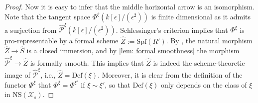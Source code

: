 \documentclass[letter, 11pt]{article}
\theoremstyle{plain}
\theoremstyle{definition}
\newcommand{\Spec}{\mathrm{Spec}}
\newcommand{\<}{\langle}
\renewcommand{\>}{\rangle}
\newcommand{\sX}{\mathcal{X}}
\newcommand{\Spf}{\mathrm{Spf}}
\newcommand{\shP}{\mathscr{P}}
\newcommand{\Def}{\mathrm{Def}}
\newcommand{\cris}{\mathrm{cris}}
\newcommand{\NS}{\mathrm{NS}}
\begin{document}
\begin{proof}

     
     Now it is easy to infer that the middle horizontal arrow is an isomorphism. Note that the tangent space $\Phi^\xi(k[\epsilon]/(\epsilon^2))$ is finite dimensional as it admits a surjection from $\hat{\shP}^\xi(k[\epsilon]/(\epsilon^2))$. Schlessinger's criterion \cite[Thm~2.11]{Schlessinger} implies that $\Phi^\xi$ is pro-representable by a formal scheme $\hat{Z} := \Spf(R')$. By \cite[Lem.~2.1.7]{HO_conjecture}, the natural morphism $\hat{Z} \to \hat{S}$ is a closed immersion, and by \ref{lem: formal smoothness} the morphism $\hat{\shP}^\xi \to \hat{Z}$ is formally smooth. This implies that $\hat{Z}$ is indeed the scheme-theoretic image of $\hat{\shP}^\xi$, i.e., $\hat{Z} = \Def(\xi)$. Moreover, it is clear from the definition of the functor $\Phi^\xi$ that $\Phi^\xi = \Phi^{\xi'}$ if $\xi \sim \xi'$, so that $\Def(\xi)$ only depends on the class of $\xi$ in $\NS(\sX_s)$.  
     
     



\end{proof}
\end{document}
